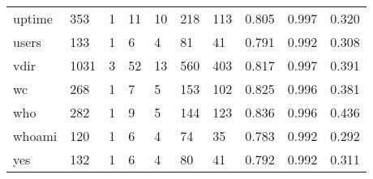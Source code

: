 \begin{longtable}{lp{2.0cm}p{2.0cm}p{2.0cm}p{2.0cm}p{2.0cm}p{2.0cm}p{2.0cm}p{2.0cm}p{2.0cm}}
uptime    &                    353 &                                  1 &                                11 &                               10 &                               218 &                             113 &                                   0.805 &                                  0.997 &                                0.320 \\
users     &                    133 &                                  1 &                                 6 &                                4 &                                81 &                              41 &                                   0.791 &                                  0.992 &                                0.308 \\
vdir      &                   1031 &                                  3 &                                52 &                               13 &                               560 &                             403 &                                   0.817 &                                  0.997 &                                0.391 \\
wc        &                    268 &                                  1 &                                 7 &                                5 &                               153 &                             102 &                                   0.825 &                                  0.996 &                                0.381 \\
who       &                    282 &                                  1 &                                 9 &                                5 &                               144 &                             123 &                                   0.836 &                                  0.996 &                                0.436 \\
whoami    &                    120 &                                  1 &                                 6 &                                4 &                                74 &                              35 &                                   0.783 &                                  0.992 &                                0.292 \\
yes       &                    132 &                                  1 &                                 6 &                                4 &                                80 &                              41 &                                   0.792 &                                  0.992 &                                0.311 \\
\end{longtable}
